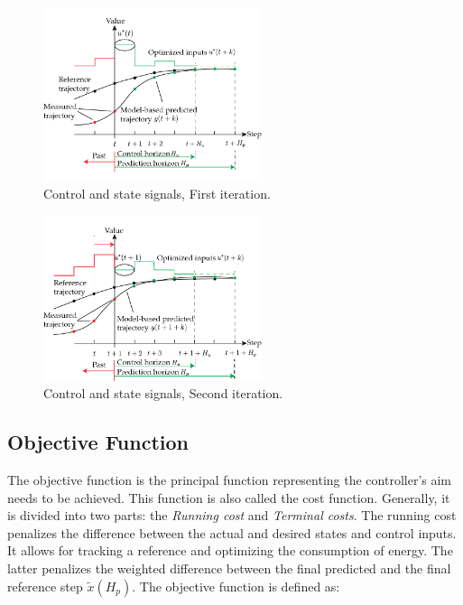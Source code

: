 \begin{figure}[H]
\begin{center}
    \includegraphics[width=0.57\textwidth]{Kap2/mpc1.png}
    \caption{Control and state signals, First iteration.} 
    \label{fig:mpc1}
\end{center}
\end{figure}

\begin{figure}[H]
\begin{center}
    \includegraphics[width=0.57\textwidth]{Kap2/mpc2.png}
    \caption{Control and state signals, Second iteration.}
    \label{fig:mpc2}
\end{center}
\end{figure}




\subsection{Objective Function}

The objective function is the principal function representing the controller's aim needs to be achieved. This function is also called the cost function. Generally, it is divided into two parts: the \textit{Running cost} and \textit{Terminal costs}. The running cost penalizes the difference between the actual and desired states and control inputs. It allows for tracking a reference and optimizing the consumption of energy. The latter penalizes the weighted difference between the final predicted and the final reference step $\tilde{x}(H_p)$. The objective function is defined as:

